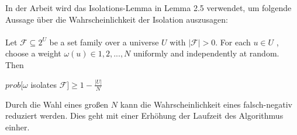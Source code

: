 In der Arbeit \cite{cygan_solving_2011} wird das Isolations-Lemma in Lemma 2.5 verwendet, um folgende Aussage über die Wahrscheinlichkeit der Isolation auszusagen:\\
\\Let $\mathcal{F} \subseteq 2^U$ be a set family over a universe $U$ with $|\mathcal{F}| > 0$. For each $u \in U$ ,
choose a weight $\omega(u) \in {1, 2, . . . , N }$ uniformly and independently at random. Then
\begin{center}
$prob[\omega$ isolates $\mathcal{F}]\geq 1 - \frac{|U|}{N}$
\end{center}

Durch die Wahl eines großen $N$ kann die Wahrscheinlichkeit eines falsch-negativ reduziert werden. Dies geht mit einer Erhöhung der Laufzeit des Algorithmus einher.
